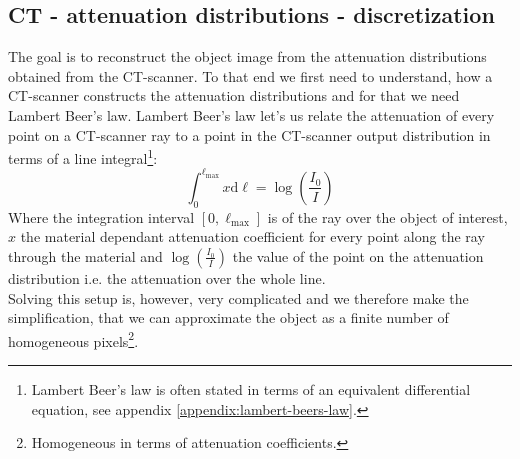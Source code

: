 \documentclass{article}
\begin{document}
\subsection{CT - attenuation distributions - discretization}
The goal is to reconstruct the object image from the attenuation distributions obtained from the CT-scanner. To that end we first need to understand, how a CT-scanner constructs the attenuation distributions and for that we need Lambert Beer's law. Lambert Beer's law let's us relate the attenuation of every point on a CT-scanner ray to a point in the CT-scanner output distribution in terms of a line integral\footnote{Lambert Beer's law is often stated in terms of an equivalent differential equation, see appendix \ref{appendix:lambert-beers-law}.}: \\
\begin{equation}
    \int_{0}^{\ell_{\max}}x \text{d} \ell = \log\left(\frac{I_0}{I}\right)
\end{equation}
Where the integration interval $[0, \ell_{\max}]$ is of the ray over the object of interest, $x$ the material dependant attenuation coefficient for every point along the ray through the material and $\log\left(\frac{I_0}{I}\right)$ the value of the point on the attenuation distribution i.e. the attenuation over the whole line. \\
Solving this setup is, however, very complicated and we therefore make the simplification, that we can approximate the object as a finite number of homogeneous pixels\footnote{Homogeneous in terms of attenuation coefficients.}. \\
\end{document}
